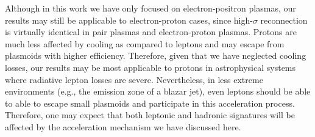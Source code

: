 \documentclass[twocolumn,twocolappendix]{aastex63}
\newcommand{\ls}{\textcolor{teal}}
\newcommand{\hz}{\textcolor{orange}}
\begin{document}

Although in this work we have only focused on electron-positron plasmas, our results may still be applicable to electron-proton cases, since high-$\sigma$ reconnection is virtually identical in pair plasmas and electron-proton plasmas. 
Protons are much less affected by cooling as compared to leptons and may escape from plasmoids with higher efficiency. Therefore, given that we have neglected cooling losses, our results may be most applicable to protons in astrophysical systems where radiative lepton losses are severe. Nevertheless, in less extreme environments (e.g., the emission zone of a blazar jet), even leptons should be able to able to escape small plasmoids and participate in this acceleration process. Therefore, one may expect that both leptonic and hadronic signatures will be affected by the acceleration mechanism we have discussed here. 

\end{document}
